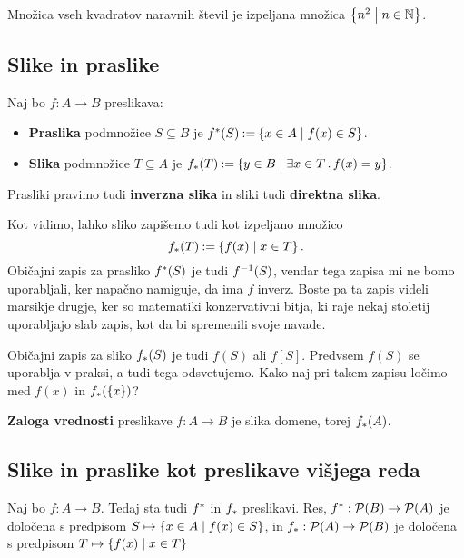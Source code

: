 \begin{zgled}
  Množica vseh kvadratov naravnih števil je izpeljana množica $\left\{ n^2 \; \middle| \; n \in \mathbb{N} \right\}$.
\end{zgled}


\subsection{Slike in praslike}

\begin{definicija}
  Naj bo $f : A \to B$ preslikava:
  \begin{itemize}
  \item \textbf{Praslika} podmnožice $S \subseteq B$ je $f^{*}(S) \mathbin{{:}{=}} \left\{ x \in A \; \middle| \; f(x) \in S \right\}$.
  \item \textbf{Slika} podmnožice $T \subseteq A$ je $f_{*}(T) \mathbin{{:}{=}} \left\{ y \in B \; \middle| \; \exists x \in T \,.\, f(x) = y \right\}$.
  \end{itemize}
\end{definicija}
%
Prasliki pravimo tudi \textbf{inverzna slika} in sliki tudi \textbf{direktna slika}.

Kot vidimo, lahko sliko zapišemo tudi kot izpeljano množico
%
\begin{equation*}
  f_{*}(T) \mathbin{{:}{=}} \left\{ f(x) \; \middle| \; x \in T \right\}.
\end{equation*}
%
Običajni zapis za prasliko $f^{*}(S)$ je tudi ${f}^{-1}(S)$, vendar tega zapisa mi ne bomo uporabljali, ker napačno namiguje, da ima $f$ inverz. Boste pa ta zapis videli marsikje drugje, ker so matematiki konzervativni bitja, ki raje nekaj stoletij uporabljajo slab zapis, kot da bi spremenili svoje navade.

Običajni zapis za sliko $f_{*}(S)$ je tudi $f(S)$ ali $f[S]$. Predvsem $f(S)$ se uporablja v praksi, a tudi tega odsvetujemo. Kako naj pri takem zapisu ločimo med $f(x)$ in $f_{*}(\left\{x\right\})$?

\begin{definicija}
  \textbf{Zaloga vrednosti} preslikave $f : A \to B$ je slika domene, torej $f_{*}(A)$.
\end{definicija}


\subsection{Slike in praslike kot preslikave višjega reda}

Naj bo $f : A \to B$. Tedaj sta tudi $f^{*}$ in $f_{*}$ preslikavi.
%
Res, $f^{*} : \mathcal{P}(B) \to \mathcal{P}(A)$ je določena s predpisom $S \mapsto \left\{ x \in A \; \middle| \; f(x) \in S \right\}$, in
$f_{*} : \mathcal{P}(A) \to \mathcal{P}(B)$ je določena s predpisom $T \mapsto \left\{ f(x) \; \middle| \; x \in T \right\}$

